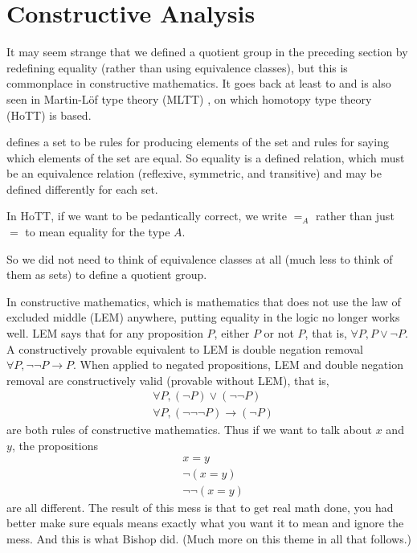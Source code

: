 \documentclass[11pt]{article}
\begin{document}
\section{Constructive Analysis}
\label{sec:constructive}

It may seem strange that we defined a quotient group in the preceding section
by redefining equality (rather than using equivalence classes), but this
is commonplace in constructive mathematics.  It goes back at least to
\citet{bishop} and is also seen in Martin-L\"{o}f type theory (MLTT)
\citep{martin-lof-mltt}, on which
homotopy type theory (HoTT)
\citep[hereinafter referred to as the HoTT book]{hott-book} is based.

 defines a set to be rules for producing elements of the set
and rules for saying which elements of the set are equal.  So equality is
a defined relation, which must be an equivalence relation (reflexive,
symmetric, and transitive) and may be defined differently for each set.

In HoTT, if we want to be pedantically correct,
we write $=_A$ rather than just $=$ to mean equality for the type $A$.

So we did not need to think of equivalence classes at all (much less to
think of them as sets) to define a quotient group.

In constructive mathematics, which is mathematics that does
not use the law of excluded middle (LEM) anywhere, putting equality
in the logic no longer works well.  LEM says that for any proposition $P$,
either $P$ or not $P$, that is, $\forall P, P \vee \neg P$.
A constructively provable equivalent to LEM is double negation
removal $\forall P, \neg \neg P \to P$.
When applied to negated propositions, LEM and double negation removal
are constructively valid (provable without LEM), that is,
\begin{align*}
   & \forall P, (\neg P) \vee (\neg \neg P)
   \\
   & \forall P, (\neg \neg \neg P) \to (\neg P)
\end{align*}
are both rules of constructive mathematics.  Thus if we want to talk about
$x$ and $y$, the propositions
\begin{align*}
   & x = y
   \\
   & \neg (x = y)
   \\
   & \neg \neg (x = y)
\end{align*}
are all different.
The result of this mess is that to get real math done, you had better
make sure equals means exactly what you want it to mean and ignore the
mess.  And this is what Bishop did.  (Much more on this theme in all
that follows.)
\end{document}
